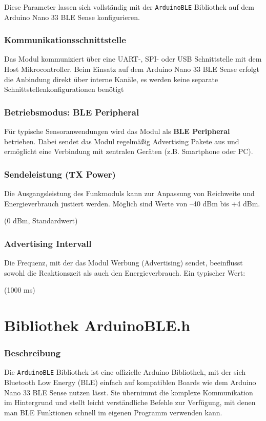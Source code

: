 Diese Parameter lassen sich vollständig mit der \texttt{ArduinoBLE} Bibliothek auf dem Arduino Nano 33 BLE Sense konfigurieren. 
\cite{Arduino.2025c}

\subsubsection{Kommunikationsschnittstelle}
Das Modul kommuniziert  über eine UART-, SPI- oder USB Schnittstelle mit dem Host Mikrocontroller. Beim Einsatz auf dem Arduino Nano 33 BLE Sense erfolgt die Anbindung direkt über interne Kanäle,  es werden keine separate Schnittstellenkonfigurationen benötigt

\subsubsection{Betriebsmodus: BLE Peripheral}
Für typische Sensoranwendungen wird das Modul als \textbf{BLE Peripheral} betrieben. Dabei sendet das Modul regelmäßig Advertising Pakete aus und ermöglicht eine Verbindung mit zentralen Geräten (z.B. Smartphone oder PC).



\subsubsection{Sendeleistung (TX Power)}
Die Ausgangsleistung des Funkmoduls kann zur Anpassung von Reichweite und Energieverbrauch justiert werden. Möglich sind Werte von –40 dBm bis +4 dBm.

 (0 dBm, Standardwert)

\subsubsection{Advertising Intervall}
Die Frequenz, mit der das Modul Werbung (Advertising) sendet, beeinflusst sowohl die Reaktionszeit als auch den Energieverbrauch. Ein typischer Wert:

 (1000 ms)

\cite{ublox:2017}

\section{Bibliothek ArduinoBLE.h}
	\subsubsection{Beschreibung}
	Die \texttt{ArduinoBLE} Bibliothek ist eine offizielle Arduino Bibliothek, mit der sich Bluetooth Low Energy (BLE) einfach auf kompatiblen Boards wie dem Arduino Nano 33 BLE Sense nutzen lässt. Sie übernimmt die komplexe Kommunikation im Hintergrund und stellt leicht verständliche Befehle zur Verfügung, mit denen man BLE Funktionen schnell im eigenen Programm verwenden kann.
	\cite{Arduino.2025c}

